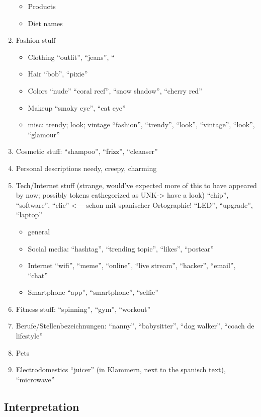 \begin{enumerate}
\begin{itemize}
      \item Products
      \item Diet names
    \end{itemize}
  \item Fashion stuff
    \begin{itemize}
      \item Clothing
          ``outfit'', ``jeans'', ``
      \item Hair
          ``bob'', ``pixie''
      \item Colors
          ``nude'' ``coral reef'', ``snow shadow'', ``cherry red''
      \item Makeup
          ``smoky eye'', ``cat eye''
      \item misc: trendy; look; vintage
          ``fashion'', ``trendy'', ``look'', ``vintage'', ``look'', ``glamour''
    \end{itemize}
  \item Cosmetic stuff:
      ``shampoo'', ``frizz'', ``cleanser''
  \item Personal descriptions
      needy, creepy, charming
  \item Tech/Internet stuff (strange, would've expected more of this to have appeared by now; possibly tokens cathegorized as UNK-> have a look)
      ``chip'', ``software'', ``clic'' <--- schon mit spanischer Ortographie!
        ``LED'', ``upgrade'', ``laptop''
    \begin{itemize}
      \item general
      \item Social media:
          ``hashtag'', ``trending topic'', ``likes'', ``postear''
      \item Internet
          ``wifi'', ``meme'', ``online'', ``live stream'', ``hacker'', ``email'', ``chat''
      \item Smartphone
          ``app'', ``smartphone'', ``selfie''
    \end{itemize}
  \item Fitness stuff:
      ``spinning'', ``gym'', ``workout''

  \item Berufe/Stellenbezeichnungen: ``nanny'', ``babysitter'', ``dog walker'', ``coach de lifestyle''
  \item Pets
  \item Electrodomestics
      ``juicer'' (in Klammern, next to the spanisch text), ``microwave''
\end{enumerate}

\subsection{Interpretation}
\label{chap:results-analysis}

